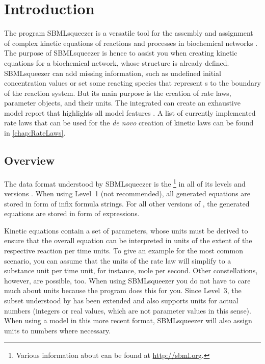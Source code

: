 \chapter{Introduction}

The program SBMLsqueezer is a versatile tool for the assembly and assignment of
complex kinetic equations of reactions and processes in biochemical networks
\citep{Draeger2008, Draeger2010a, Draeger2011a}.
The purpose of SBMLsqueezer is hence to assist you when creating kinetic equations for
a biochemical network, whose structure is already defined.
SBMLsqueezer can add missing information, such as undefined initial concentration values
or set some reacting species that represent {\gene}s to the boundary of the reaction system.
But its main purpose is the creation of rate laws, parameter objects, and their units.
The integrated \SBMLLaTeX can create an exhaustive model report that highlights all
model features \citep{Draeger2009b}.
A list of currently implemented rate laws that can be used for the \emph{de novo}
creation of kinetic laws can be found in \vref{chap:RateLaws}.

\section{Overview}

The data format understood by SBMLsqueezer is the
\SBML\footnote{Various information about \SBML can be found at \url{http://sbml.org}.}
in all of its levels and versions \citep{Hucka2001, Hucka2003, M.Hucka03012003, Hucka2007, Hucka2008,
Hucka2010a, Hucka2015, Finney2003, Finney2006}.
When using \SBML Level~1 (not recommended), all generated equations are stored
in form of infix formula strings. For all other versions of \SBML, the generated
equations are stored in form of \MathML \citep{Buswell1999} expressions.

Kinetic equations contain a set of parameters, whose units must be derived to
ensure that the overall equation can be interpreted in units of the extent of the
respective reaction per time units.
To give an example for the most common scenario, you can assume that the units
of the rate law will simplify to a substance unit per time unit, for instance,
mole per second.
Other constellations, however, are possible, too.
When using SBMLsqueezer you do not have to care much about units because the
program does this for you.
Since Level~3, the \MathML subset understood by \SBML has been extended and also supports
units for actual numbers (integers or real values, which are not parameter values in this sense).
When using a model in this more recent format, SBMLsqueezer will also assign units
to numbers where necessary.

